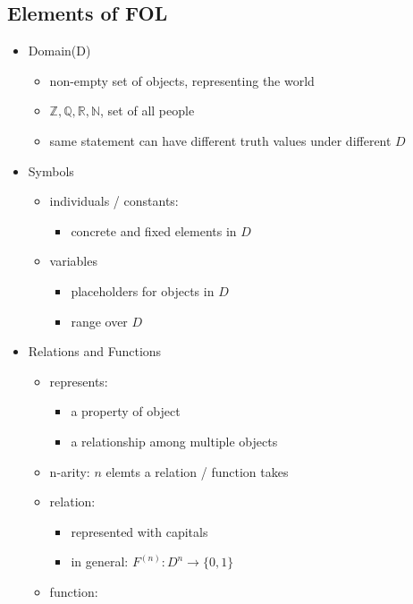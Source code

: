 \documentclass[11pt]{article}
\newcommand{\N}{{\mathbb{N}}}
\newcommand{\Q}{{\mathbb{Q}}}
\newcommand{\R}{{\mathbb{R}}}
\newcommand{\Z}{{\mathbb{Z}}}
\begin{document}
\subsection{Elements of FOL}
\begin{itemize}
    \item Domain(D)
    \begin{itemize}
        \item non-empty set of objects, representing the world
        \item $\Z, \Q, \R, \N$, set of all people 
        \item same statement can have different truth values under different $D$
    \end{itemize}
    \item Symbols 
    \begin{itemize}
        \item individuals / constants:
        \begin{itemize}
            \item concrete and fixed elements in $D$
        \end{itemize}
        \item variables
        \begin{itemize}
            \item placeholders for objects in $D$
            \item range over $D$
        \end{itemize}
    \end{itemize}
    \item Relations and Functions 
    \begin{itemize}
        \item represents:
        \begin{itemize}
            \item a property of object 
            \item a relationship among multiple objects 
        \end{itemize}
        \item n-arity: $n$ elemts a relation / function takes 
        \item relation:
        \begin{itemize}
            \item represented with capitals
            \item in general: $F^{(n)}: D^n\rightarrow\{0,1\}$
        \end{itemize}
        \item function:

\end{itemize}
\end{itemize}
\end{document}
